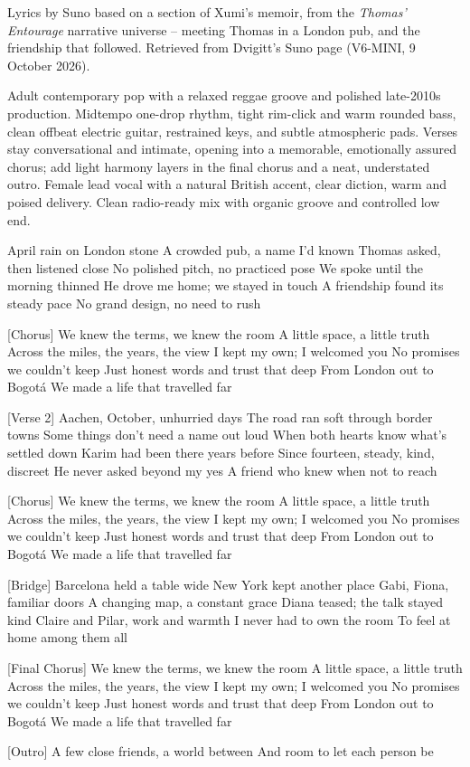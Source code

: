 \begin{notes}
Lyrics by Suno based on a section of Xumi's memoir, from the \emph{Thomas' Entourage} narrative universe -- meeting Thomas in a London pub, and the friendship that followed. Retrieved from Dvigitt's Suno page (V6-MINI, 9 October 2026).
\end{notes}
\begin{style}
Adult contemporary pop with a relaxed reggae groove and polished late-2010s production. Midtempo one-drop rhythm, tight rim-click and warm rounded bass, clean offbeat electric guitar, restrained keys, and subtle atmospheric pads. Verses stay conversational and intimate, opening into a memorable, emotionally assured chorus; add light harmony layers in the final chorus and a neat, understated outro. Female lead vocal with a natural British accent, clear diction, warm and poised delivery. Clean radio-ready mix with organic groove and controlled low end.
\end{style}
\begin{lyrics}
[Verse 1]
April rain on London stone
A crowded pub, a name I’d known
Thomas asked, then listened close
No polished pitch, no practiced pose
We spoke until the morning thinned
He drove me home; we stayed in touch
A friendship found its steady pace
No grand design, no need to rush

[Chorus]
We knew the terms, we knew the room
A little space, a little truth
Across the miles, the years, the view
I kept my own; I welcomed you
No promises we couldn’t keep
Just honest words and trust that deep
From London out to Bogotá
We made a life that travelled far

[Verse 2]
Aachen, October, unhurried days
The road ran soft through border towns
Some things don’t need a name out loud
When both hearts know what’s settled down
Karim had been there years before
Since fourteen, steady, kind, discreet
He never asked beyond my yes
A friend who knew when not to reach

[Chorus]
We knew the terms, we knew the room
A little space, a little truth
Across the miles, the years, the view
I kept my own; I welcomed you
No promises we couldn’t keep
Just honest words and trust that deep
From London out to Bogotá
We made a life that travelled far

[Bridge]
Barcelona held a table wide
New York kept another place
Gabi, Fiona, familiar doors
A changing map, a constant grace
Diana teased; the talk stayed kind
Claire and Pilar, work and warmth
I never had to own the room
To feel at home among them all

[Final Chorus]
We knew the terms, we knew the room
A little space, a little truth
Across the miles, the years, the view
I kept my own; I welcomed you
No promises we couldn’t keep
Just honest words and trust that deep
From London out to Bogotá
We made a life that travelled far

[Outro]
A few close friends, a world between
And room to let each person be
\end{lyrics}
